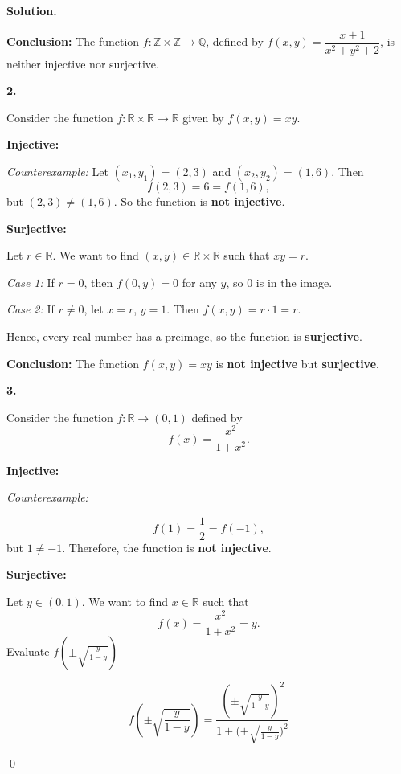 \documentclass[12pt]{article}
\newenvironment{solution}{%
	\par\medskip
	\noindent\textbf{Solution.}\par\nopagebreak
}{%
	\hfill \qed \par\medskip
}
\begin{document}
\begin{solution}
		\medskip
		
		\noindent\textbf{Conclusion:} The function \(f : \mathbb{Z} \times \mathbb{Z} \to \mathbb{Q}\), defined by \(f(x, y) = \dfrac{x + 1}{x^2 + y^2 + 2}\), is neither injective nor surjective.
		
		\textbf{2.}
		
		Consider the function \( f : \mathbb{R} \times \mathbb{R} \rightarrow \mathbb{R} \) given by \( f(x, y) = xy \).
		
		\textbf{Injective:}
		
		\textit{Counterexample:} Let \( (x_1, y_1) = (2, 3) \) and \( (x_2, y_2) = (1, 6) \). Then
		\[
		f(2, 3) = 6 = f(1, 6),
		\]
		but \( (2, 3) \neq (1, 6) \). So the function is \textbf{not injective}.
		
		\textbf{Surjective:}
		
		Let \( r \in \mathbb{R} \). We want to find \( (x, y) \in \mathbb{R} \times \mathbb{R} \) such that \( xy = r \).
		
		\textit{Case 1:} If \( r = 0 \), then \( f(0, y) = 0 \) for any \( y \), so 0 is in the image.
		
		\textit{Case 2:} If \( r \neq 0 \), let \( x = r \), \( y = 1 \). Then \( f(x, y) = r \cdot 1 = r \).
		
		Hence, every real number has a preimage, so the function is \textbf{surjective}.
		
		\medskip
		
		\noindent\textbf{Conclusion:} The function \( f(x, y) = xy \) is \textbf{not injective} but \textbf{surjective}.
		
		\bigskip
		
		\textbf{3.}
		
		Consider the function \( f : \mathbb{R} \rightarrow (0, 1) \) defined by
		\[
		f(x) = \frac{x^2}{1 + x^2}.
		\]
		
		\textbf{Injective:}
		
		\textit{Counterexample: }
		
		\[
		f(1) = \frac{1}{2} = f(-1),
		\]
		but \( 1 \neq -1 \). Therefore, the function is \textbf{not injective}.
		
		\textbf{Surjective:}
		
Let \( y \in (0, 1) \). We want to find \( x \in \mathbb{R} \) such that
\[
f(x) = \frac{x^2}{1 + x^2} = y.
\]
 Evaluate $f(\pm\sqrt{\frac{y}{1-y}})$
 
 \[
 f(\pm\sqrt{\frac{y}{1-y}}) = \frac{(\pm\sqrt{\frac{y}{1-y}})^2}{1+(\pm\sqrt{\frac{y}{1-y})^2}}
 \]
 

\end{solution}
\end{document}
